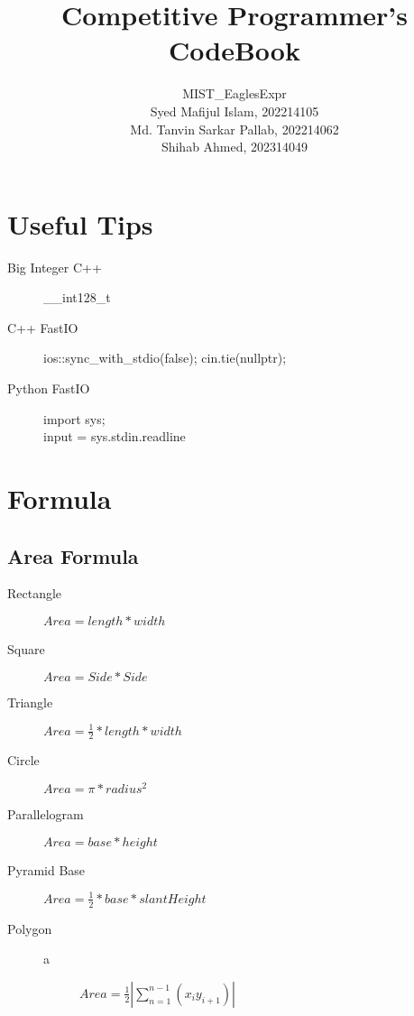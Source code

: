 \documentclass[10pt, a4paper]{article}
\title{Competitive Programmer’s CodeBook}
\author{MIST\_EaglesExpr\\[2cm] Syed Mafijul Islam, 202214105\\
Md. Tanvin Sarkar Pallab, 202214062\\
Shihab Ahmed, 202314049
}
\begin{document}
\maketitle
\thispagestyle{empty}

\newpage
\tableofcontents
\newpage

\begin{multicols}{2}

\section{Useful Tips}
\begin{description}
    \item[Big Integer C++] \_\_int128\_t
    \item[C++ FastIO] \hfill \break
    ios::sync\_with\_stdio(false);
    cin.tie(nullptr);
    \item[Python FastIO] \hfill \break
    import sys; \\
    input = sys.stdin.readline
\end{description}

\section{Formula}
\subsection{Area Formula}
\begin{description}
    \item[Rectangle] 
        \begin{math}
            Area = length * width
        \end{math}
    \item[Square] 
        \begin{math}
            Area = Side * Side
        \end{math}
    \item[Triangle] 
        \begin{math}
            Area = \frac{1}{2} * length * width
        \end{math}
    \item[Circle] 
        \begin{math}
            Area = \pi * radius^2
        \end{math}
    \item[Parallelogram] 
        \begin{math}
            Area = base * height
        \end{math}
    \item[Pyramid Base] 
        \begin{math}
            Area = \frac{1}{2} * base * slantHeight
        \end{math}
    \item[Polygon] \hfill
        \begin{description}
            \item[a] 
            \begin{math}
                Area = \frac{1}{2}|\sum_{n=1}^{n-1}(x_iy_{i+1})|
            \end{math}


\end{description}
\end{description}
\end{multicols}
\end{document}
